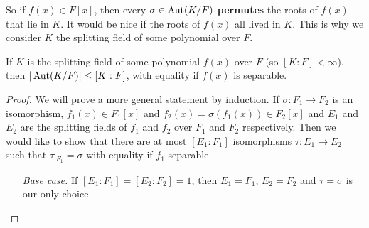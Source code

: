 \documentclass[12pt]{article}
\begin{document}
So if $f(x)\in F[x]$, then every $\sigma\in \operatorname{Aut}(K/F)$ \textbf{permutes} the roots of $f(x)$ that lie in $K$. It would be nice if the roots of $f(x)$ all lived in $K$. This is why we consider $K$ the splitting field of some polynomial over $F$.

\begin{proposition}
    If $K$ is the splitting field of some polynomial $f(x)$ over $F$ (so $[K:F]<\infty$), then $|\operatorname{Aut}(K/F)|\leq [K:F]$, with equality if $f(x)$ is separable.
\end{proposition}
\begin{proof}
    We will prove a more general statement by induction.
    If $\sigma:F_1\to F_2$ is an isomorphism, $f_1(x)\in F_1[x]$ and $f_2(x)=\sigma(f_1(x))\in F_2[x]$ and $E_1$ and $E_2$ are the splitting fields of $f_1$ and $f_2$ over $F_1$ and $F_2$ respectively. Then we would like to show that there are at most $[E_1:F_1]$ isomorphisms $\tau: E_1\to E_2$ such that $\tau_{|F_1}=\sigma$ with equality if $f_1$ separable.

    \begin{enumerate}[align=left]
        \item[\textit{Base case. }] If $[E_1:F_1]=[E_2:F_2]=1$, then $E_1=F_1$, $E_2=F_2$ and $\tau=\sigma$ is our only choice.
        

\end{enumerate}
\end{proof}
\end{document}
